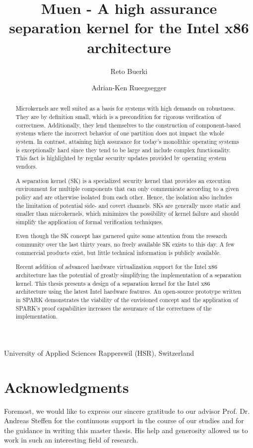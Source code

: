 \documentclass[a4paper,twoside]{report}
\title{Muen - A high assurance separation kernel for the Intel x86 architecture}
\author{Reto Buerki \and Adrian-Ken Rueegsegger}
\begin{document}


\maketitle

University of Applied Sciences Rapperswil (HSR), Switzerland

\begin{abstract}
Microkernels are well suited as a basis for systems with high demands on
robustness. They are by definition small, which is a precondition for rigorous
verification of correctness. Additionally, they lend themselves to the
construction of component-based systems where the incorrect behavior of one
partition does not impact the whole system. In contrast, attaining high
assurance for today's monolithic operating systems is exceptionally hard since
they tend to be large and include complex functionality. This fact is
highlighted by regular security updates provided by operating system vendors.

A separation kernel (SK) is a specialized security kernel that provides an
execution environment for multiple components that can only communicate
according to a given policy and are otherwise isolated from each other. Hence,
the isolation also includes the limitation of potential side- and covert
channels. SKs are generally more static and smaller than microkernels, which
minimizes the possibility of kernel failure and should simplify the application
of formal verification techniques.

Even though the SK concept has garnered quite some attention from the research
community over the last thirty years, no freely available SK exists to this
day. A few commercial products exist, but little technical information is
publicly available.

Recent addition of advanced hardware virtualization support for the Intel x86
architecture has the potential of greatly simplifying the implementation of a
separation kernel. This thesis presents a design of a separation kernel for the
Intel x86 architecture using the latest Intel hardware features. An open-source
prototype written in SPARK demonstrates the viability of the envisioned
concept and the application of SPARK's proof capabilities increases the
assurance of the correctness of the implementation.
\end{abstract}

\section*{Acknowledgments}
Foremost, we would like to express our sincere gratitude to our advisor Prof.
Dr. Andreas Steffen for the continuous support in the course of our studies and
for the guidance in writing this master thesis. His help and generosity allowed
us to work in such an interesting field of research.
\end{document}
